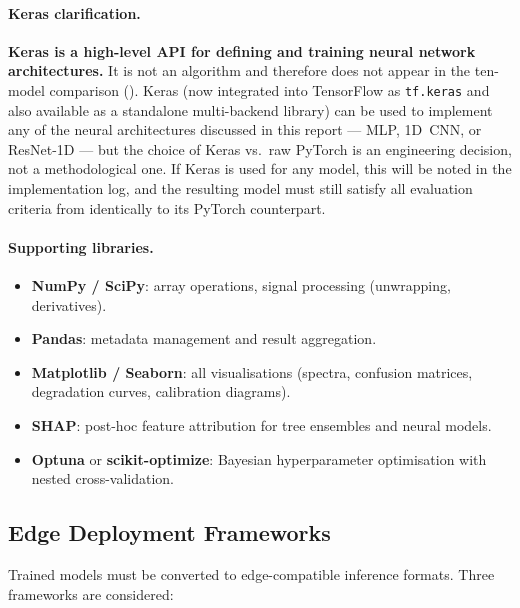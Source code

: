 \paragraph{Keras clarification.}
\textbf{Keras is a high-level API for defining and training neural
network architectures.}  It is not an algorithm and therefore does not
appear in the ten-model comparison ().  Keras
(now integrated into TensorFlow as \texttt{tf.keras} and also
available as a standalone multi-backend library) can be used to
implement any of the neural architectures discussed in this report ---
MLP, 1D~CNN, or ResNet-1D --- but the choice of Keras vs.\ raw
PyTorch is an engineering decision, not a methodological one.  If
Keras is used for any model, this will be noted in the implementation
log, and the resulting model must still satisfy all evaluation criteria
from  identically to its PyTorch counterpart.

\paragraph{Supporting libraries.}
\begin{itemize}
  \item \textbf{NumPy / SciPy}: array operations, signal processing
        (unwrapping, derivatives).
  \item \textbf{Pandas}: metadata management and result aggregation.
  \item \textbf{Matplotlib / Seaborn}: all visualisations (spectra,
        confusion matrices, degradation curves, calibration diagrams).
  \item \textbf{SHAP}: post-hoc feature attribution for tree ensembles
        and neural models.
  \item \textbf{Optuna} or \textbf{scikit-optimize}: Bayesian
        hyperparameter optimisation with nested cross-validation.
\end{itemize}


\subsection{Edge Deployment Frameworks}
\label{subsec:edge_frameworks}

Trained models must be converted to edge-compatible inference formats.
Three frameworks are considered:

